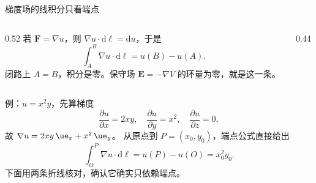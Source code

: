 \documentclass[fontset=windows, chinese, 10pt, xcolor=dvipsnames]{beamer}
\begin{document}
\begin{frame}{梯度场的线积分只看端点}
  \begin{columns}[c]
    \begin{column}{0.52\textwidth}
      若 $\mathbf{F}=\nabla u$，则 $\nabla u\cdot\mathrm{d}\boldsymbol{\ell}=\mathrm{d}u$，于是
      \begin{equation*}
        \int_A^B\nabla u\cdot\mathrm{d}\boldsymbol{\ell}
        =u(B)-u(A).
      \end{equation*}
      闭路上 $A=B$，积分是零。保守场 $\mathbf{E}=-\nabla V$ 的环量为零，就是这一条。
    \end{column}
    \begin{column}{0.44\textwidth}
      \centering
      \scalebox{0.88}{}
    \end{column}
  \end{columns}
\end{frame}

\begin{frame}{例：$u=x^2 y$，先算梯度}
  \begin{equation*}
    \frac{\partial u}{\partial x}=2xy,\quad
    \frac{\partial u}{\partial y}=x^2,\quad
    \frac{\partial u}{\partial z}=0,
  \end{equation*}
  故 $\nabla u=2xy\,\ue_x+x^2\,\ue_y$。
  从原点到 $P=(x_0,y_0)$，端点公式直接给出
  \begin{equation*}
    \int_O^P\nabla u\cdot\mathrm{d}\boldsymbol{\ell}
    =u(P)-u(O)=x_0^2 y_0.
  \end{equation*}
  下面用两条折线核对，确认它确实只依赖端点。
\end{frame}
\end{document}

